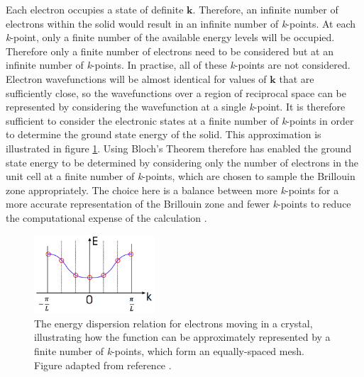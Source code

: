 Each electron occupies a state of definite $\mathbf{k}$. Therefore, an infinite number of electrons within the solid would result in an infinite number of \textit{k}-points. At each \textit{k}-point, only a finite number of the available energy levels will be occupied. Therefore only a finite number of electrons need to be considered but at an infinite number of \textit{k}-points. In practise, all of these \textit{k}-points are not considered. 
Electron wavefunctions will be almost identical for values of $\mathbf{k}$ that are sufficiently close, so the wavefunctions over a region of reciprocal space can be represented by considering the wavefunction at a single \textit{k}-point. It is therefore sufficient to consider the electronic states at a finite number of \textit{k}-points in order to determine the ground state energy of the solid. This approximation is illustrated in figure \ref{energy_dispersion}. Using Bloch's Theorem therefore has enabled the ground state energy to be determined by considering only the number of electrons in the unit cell at a finite number of \textit{k}-points, which are chosen to sample the Brillouin zone appropriately. The choice here is a balance between more \textit{k}-points for a more accurate representation of the Brillouin zone and fewer \textit{k}-points to reduce the computational expense of the calculation \cite{bloch-thesis}.\\

\begin{figure}[h!]
  \centering
    \includegraphics[width=0.4\textwidth]{figures/energy_dispersion.png}
    \caption{The energy dispersion relation for electrons moving in a crystal, illustrating how the function can be approximately represented by a finite number of \textit{k}-points, which form an equally-spaced mesh. Figure adapted from reference .}
  \label{energy_dispersion}
\end{figure}

